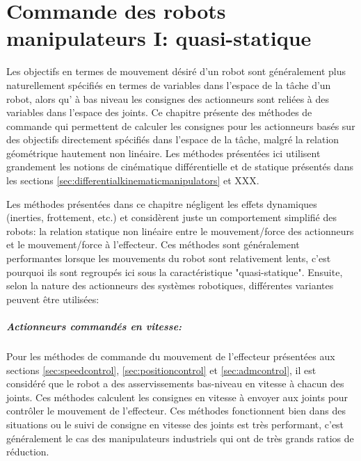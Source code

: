 \chapter{Commande des robots manipulateurs I: quasi-statique}
\label{sec:staticcontrol}

Les objectifs en termes de mouvement désiré d'un robot sont généralement plus naturellement spécifiés en termes de variables dans l'espace de la tâche d'un robot, alors qu’ à bas niveau les consignes des actionneurs sont reliées à des variables dans l'espace des joints. Ce chapitre présente des méthodes de commande qui permettent de calculer les consignes pour les actionneurs basés sur des objectifs directement spécifiés dans l'espace de la tâche, malgré la relation géométrique hautement non linéaire. Les méthodes présentées ici utilisent grandement les notions de cinématique différentielle et de statique présentés dans les sections \ref{sec:differentialkinematicmanipulators} et XXX.

Les méthodes présentées dans ce chapitre négligent les effets dynamiques (inerties, frottement, etc.) et considèrent juste un comportement simplifié des robots: la relation statique non linéaire entre le mouvement/force des actionneurs et le mouvement/force à l'effecteur. Ces méthodes sont généralement performantes lorsque les mouvements du robot sont relativement lents, c'est pourquoi ils sont regroupés ici sous la caractéristique "quasi-statique". Ensuite, selon la nature des actionneurs des systèmes robotiques, différentes variantes peuvent être utilisées:

\paragraph{Actionneurs commandés en vitesse:} Pour les méthodes de commande du mouvement de l'effecteur présentées aux sections \ref{sec:speedcontrol}, \ref{sec:positioncontrol} et \ref{sec:admcontrol}, il est considéré que le robot a des asservissements bas-niveau en vitesse à chacun des joints. Ces méthodes calculent les consignes en vitesse à envoyer aux joints pour contrôler le mouvement de l'effecteur. Ces méthodes fonctionnent bien dans des situations ou le suivi de consigne en vitesse des joints est très performant, c'est généralement le cas des manipulateurs industriels qui ont de très grands ratios de réduction.

